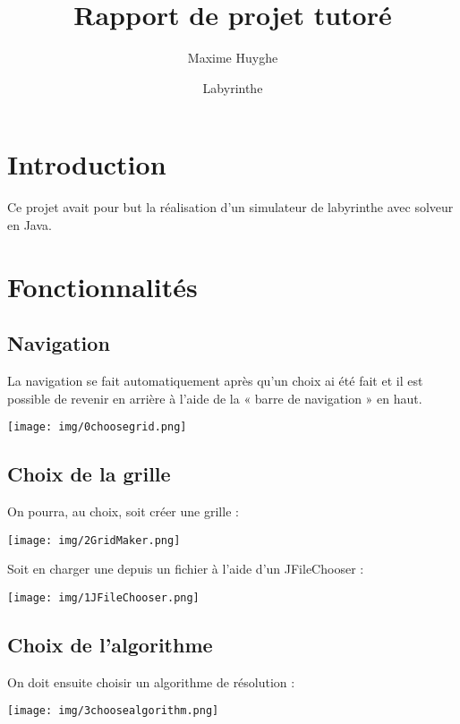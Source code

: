 \documentclass[12pt]{scrartcl}
\author{Maxime Huyghe}
\date{Labyrinthe}
\title{Rapport de projet tutoré}
\begin{document}
\maketitle
\tableofcontents

\clearpage
\section{Introduction}
\label{sec:org579aa60}
Ce projet avait pour but la réalisation d'un simulateur de labyrinthe avec solveur en Java.

\section{Fonctionnalités}
\label{sec:orgc6150f9}
\subsection{Navigation}
\label{sec:org41aada4}
La navigation se fait automatiquement après qu'un choix ai été fait et il est possible de revenir en
arrière à l'aide de la « barre de navigation » en haut.
\begin{center}
\texttt{[image: img/0choosegrid.png]}
\end{center}
\subsection{Choix de la grille}
\label{sec:org265d678}
On pourra, au choix, soit créer une grille :
\begin{center}
\texttt{[image: img/2GridMaker.png]}
\end{center}
Soit en charger une depuis un fichier à l'aide d'un JFileChooser :
\begin{center}
\texttt{[image: img/1JFileChooser.png]}
\end{center}
\subsection{Choix de l'algorithme}
\label{sec:orgf23b911}
On doit ensuite choisir un algorithme de résolution :
\begin{center}
\texttt{[image: img/3choosealgorithm.png]}
\end{center}
\end{document}
